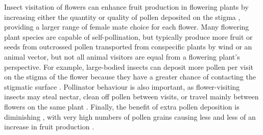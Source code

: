 \documentclass[12pt, draft]{article} %
\begin{document}
Insect visitation of flowers can enhance fruit production in flowering plants by increasing either the quantity or quality of pollen deposited on the stigma \citep{stephenson1981,burd1994,aizen2007}, providing a larger range of female mate choice for each flower.
Many flowering plant species are capable of self-pollination, but typically produce more fruit or seeds from outcrossed pollen \citep{knight2005} transported from conspecific plants by wind or an animal vector, but not all animal visitors are equal from a flowering plant's perspective.
For example, large-bodied insects can deposit more pollen per visit on the stigma of the flower because they have a greater chance of contacting the stigmatic surface \citep{sahli2007}. 
Pollinator behaviour is also important, as flower-visiting insects may steal nectar, clean off pollen between visits, or travel mainly between flowers on the same plant \citep{thomson1986, herrera1987}.
Finally, the benefit of extra pollen deposition is diminishing \citep{plowright1981}, with very high numbers of pollen grains causing less and less of an increase in fruit production \citep{ashman2004, harder2016}.
\end{document}
